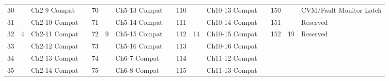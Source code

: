 \documentclass[]{article}
\begin{document}
\begin{landscape}
\begin{table}[]
\begin{tabular}{lllllllllllllll}
			30           &                     & Ch2-9  Compat                  &                    & 70           &                      & Ch5-13  Compat    &  & 110          &                      & Ch10-13  Compat   &  & 150                                                                                             &                                              & CVM/Fault Monitor Latch                            \\ \cline{15-15} 
			31           &                     & Ch2-10  Compat                 &                    & 71           &                      & Ch5-14  Compat    &  & 111          &                      & Ch10-14  Compat   &  & 151                                                                                             &                                              & Reserved                                           \\
			32           & \multirow{-8}{*}{4} & Ch2-11  Compat                 &                    & 72           & \multirow{-8}{*}{9}  & Ch5-15  Compat    &  & 112          & \multirow{-8}{*}{14} & Ch10-15  Compat   &  & 152                                                                                             & \multirow{-8}{*}{19}                         & Reserved                                           \\ \cline{1-3} \cline{5-7} \cline{9-11} \cline{13-15} 
			33           &                     & Ch2-12  Compat                 &                    & 73           &                      & Ch5-16  Compat    &  & 113          &                      & Ch10-16  Compat   &  & \cellcolor[HTML]{C0C0C0}                                                                        & \cellcolor[HTML]{C0C0C0}                     & \cellcolor[HTML]{C0C0C0}                           \\
			34           &                     & Ch2-13  Compat                 &                    & 74           &                      & Ch6-7  Compat     &  & 114          &                      & Ch11-12  Compat   &  & \cellcolor[HTML]{C0C0C0}                                                                        & \cellcolor[HTML]{C0C0C0}                     & \cellcolor[HTML]{C0C0C0}                           \\
			35           &                     & Ch2-14  Compat                 &                    & 75           &                      & Ch6-8  Compat     &  & 115          &                      & Ch11-13  Compat   &  & \cellcolor[HTML]{C0C0C0}                                                                        & \cellcolor[HTML]{C0C0C0}                     & \cellcolor[HTML]{C0C0C0}                           \\

\end{tabular}
\end{table}
\end{landscape}
\end{document}
